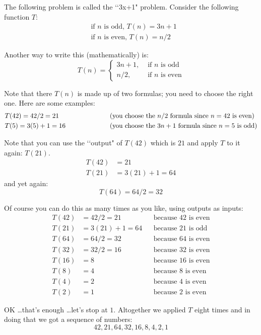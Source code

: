 The following problem is called the \lq\lq 3x+1" problem. Consider the
following function $T$:
\begin{align*}
&\text{if $n$ is odd, $T(n) = 3n + 1$} \\
&\text{if $n$ is even, $T(n) = n / 2$}
\end{align*}

Another way to write this (mathematically) is:
\[
T(n) =
\begin{cases}
3n + 1, & \text{ if $n$ is odd} \\
n/2,    & \text{ if $n$ is even}
\end{cases}
\]

Note that there $T(n)$ is made up of two formulas; you need to choose the
right one. Here are some examples:
\begin{align*}
& T(42) = 42/2 = 21 & \hspace{2 cm}
& \text{(you choose the $n / 2$ formula since $n = 42$ is even)} \\
& T(5) = 3(5) + 1 = 16 & \hspace{2 cm}
& \text{(you choose the $3n + 1$ formula since $n = 5$ is odd)}
\end{align*}

Note that you can use the \lq\lq output" of $T(42)$ which is $21$ and
apply $T$ to it again: $T(21)$. 
\begin{align*}
T(42) &= 21 \\
T(21) &= 3(21) + 1 = 64
\end{align*}
and yet again:
\[T(64) = 64/2 = 32\]

Of course you can do this as many times as you like, using outputs as inputs:
\begin{align*}
T(42) &= 42/2 = 21 & &\text{because $42$ is even} \\
T(21) &= 3(21) + 1 = 64	& &\text{because $21$ is odd} \\
T(64) &= 64/2 = 32 & &\text{because $64$ is even} \\
T(32) &= 32/2 = 16 & &\text{because $32$ is even} \\
T(16) &= 8  & &\text{because $16$ is even} \\
T(8) &= 4 & &\text{because $8$ is even} \\
T(4) &= 2 & &\text{because $4$ is even} \\
T(2) &= 1 & &\text{because $2$ is even}
\end{align*}

OK \dots that's enough \dots let's stop at $1$. Altogether we applied $T$
eight times and in doing that we got a sequence of numbers:
\[42, 21, 64, 32, 16, 8, 4, 2, 1\]

